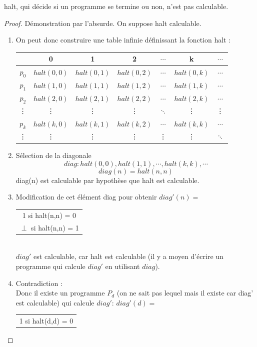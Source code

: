 \begin{mytheo}[halt]
	halt, qui décide si un programme se termine ou non, n'est pas calculable.
	\begin{proof}
	Démonstration par l'absurde. On suppose halt calculable.
	\begin{enumerate}
		\item On peut donc construire une table infinie définissant la fonction
			halt : \\
			\begin{tabular}{|c||c|c|c|c|c|c|}
				\hline
				& 0 & 1 & 2 & $\cdots$ & k & $\cdots$ \\
				\hline
				$p_0$ & $halt(0,0)$ & $halt(0,1)$ & $halt(0,2)$ & $\cdots$ & $halt(0,k)$ & $\cdots$ \\
				$p_1$ & $halt(1,0)$ & $halt(1,1)$ & $halt(1,2)$ & $\cdots$ & $halt(1,k)$ & $\cdots$ \\
				$p_2$ & $halt(2,0)$ & $halt(2,1)$ & $halt(2,2)$ & $\cdots$ & $halt(2,k)$ & $\cdots$ \\
				\vdots & {\vdots} &{\vdots}& {\vdots} & $\ddots$ & {\vdots} &{\vdots}\\
				$p_k$ & $halt(k,0)$ & $halt(k,1)$ & $halt(k,2)$ & $\cdots$ & $halt(k,k)$ & $\cdots$ \\
				\vdots & {\vdots} &{\vdots}& {\vdots} & {\vdots} & {\vdots} &$\ddots$\\
				\hline
			\end{tabular}
		\item Sélection de la diagonale
			\[ diag :halt(0,0),halt(1,1),\cdots ,halt(k,k), \cdots \]
			\[diag(n) = halt(n,n)\]
diag(n) est calculable par hypothèse que halt est calculable.
		\item Modification de cet élément diag pour obtenir
			$diag'(n) =$
			\begin{tabular}{c}
				1 si halt(n,n) = 0\\
				$\perp$ si halt(n,n) = 1\\
			\end{tabular}\\
			$diag'$ est calculable, car halt est calculable (il y a moyen
			d'écrire un programme qui calcule $diag'$ en utilisant $diag$).
		\item Contradiction :\\
		       	Donc il existe un programme $P_d$ (on ne sait pas lequel mais il existe car diag' est calculable) qui calcule
			$diag'$:
			$diag'(d) =$
			\begin{tabular}{c}
				1 si halt(d,d) = 0\\

\end{tabular}
\end{enumerate}
\end{proof}
\end{mytheo}
